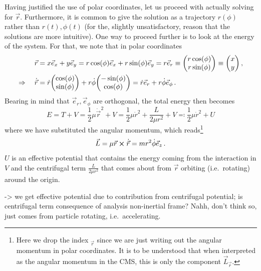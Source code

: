 \documentclass[../class_mech_main.tex]{subfiles}
\begin{document}
Having justified the use of polar coordinates, let us proceed with actually solving for $\vec{r}$. Furthermore, it is common to give the solution as a trajectory $r(\phi)$ rather than $r(t), \phi(t)$ (for the, slightly unsatisfactory, reason that the solutions are more intuitive). One way to proceed further is to look at the energy of the system. For that, we note that in polar coordinates
\begin{align}
	\vec{r} &= x \vec{e}_x + y \vec{e}_y = r \cos(\phi) \vec{e}_x + r \sin(\phi) \vec{e}_y = r \vec{e}_r \equiv \mqty(r \cos(\phi) \\ r \sin(\phi)) \equiv \mqty(x \\ y)
	\, ,
	\\
	\Rightarrow \quad \dot{\vec{r}} &= \dot{r} \mqty(\cos(\phi) \\ \sin(\phi)) + r \dot{\phi} \mqty(- \sin(\phi) \\ \cos(\phi)) = \dot{r} \vec{e}_r + r \dot{\phi} \vec{e}_\phi
	\, .
\end{align}
Bearing in mind that $\vec{e}_r, \vec{e}_\phi$ are orthogonal, the total energy then becomes
\begin{equation}\label{eq:energy_central_force}
	E = T + V = \frac{1}{2} \mu \dot{\vec{r}}^2 + V = \frac{1}{2} \mu \dot{r}^2 + \frac{L}{2 \mu r^2} + V \eqqcolon \frac{1}{2} \mu \dot{r}^2 + U
\end{equation}
where we have substituted the angular momentum, which reads\footnote{Here we drop the index ${}_{\vec{r}}$ since we are just writing out the angular momentum in polar coordinates. It is to be understood that when interpreted as the angular momentum in the CMS, this is only the component $\vec{L}_{\vec{r}}$.}
\begin{equation}
	\vec{L} = \mu \vec{r} \cross \dot{\vec{r}} = m r^2 \dot{\phi} \vec{e}_z
	\, .
\end{equation}
$U$ is an effective potential that contains the energy coming from the interaction in $V$ and the centrifugal term $\frac{L}{2 \mu r^2}$ that comes about from $\vec{r}$ orbiting (i.e.~rotating) around the origin.


-> we get effective potential due to contribution from centrifugal potential; is centrifugal term consequence of analysis non-inertial frame? Nahh, don't think so, just comes from particle rotating, i.e.~accelerating.
\end{document}
